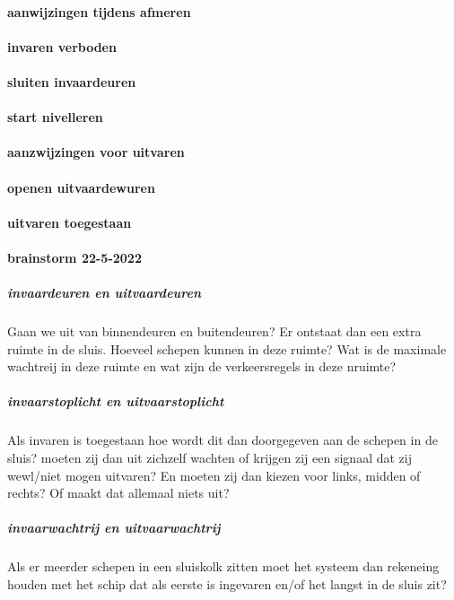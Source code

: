 \paragraph{aanwijzingen tijdens afmeren}

\paragraph{invaren verboden}

\paragraph{sluiten invaardeuren}

\paragraph{start nivelleren}

\paragraph{aanzwijzingen voor uitvaren}
\paragraph{openen uitvaardewuren}

\paragraph{uitvaren toegestaan}




\paragraph{brainstorm 22-5-2022}

\subparagraph{invaardeuren en uitvaardeuren}
Gaan we uit van binnendeuren en buitendeuren? Er ontstaat dan een extra ruimte in de sluis. Hoeveel schepen kunnen in deze ruimte? Wat is de maximale wachtreij in deze ruimte en wat zijn de verkeersregels in deze nruimte?
\subparagraph{invaarstoplicht en uitvaarstoplicht}
Als invaren is toegestaan hoe wordt dit dan doorgegeven aan de schepen in de sluis? moeten zij dan uit zichzelf wachten of krijgen zij een signaal dat zij wewl/niet mogen uitvaren? En moeten zij dan kiezen voor links, midden of rechts? Of maakt dat allemaal niets uit?

\subparagraph{invaarwachtrij en uitvaarwachtrij}
Als er meerder schepen in een sluiskolk zitten moet het systeem dan rekeneing houden met het schip dat als eerste is ingevaren en/of het langst in de sluis zit?


